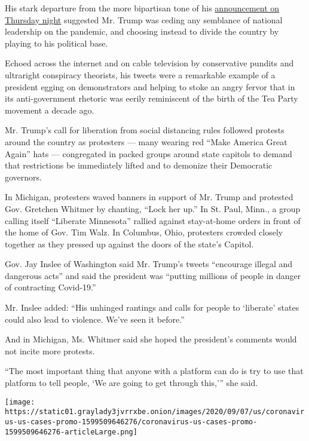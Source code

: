 His stark departure from the more bipartisan tone of his
\href{https://www.nytimes3xbfgragh.onion/2020/04/16/us/politics/coronavirus-trump-guidelines.html}{announcement
on Thursday night} suggested Mr. Trump was ceding any semblance of
national leadership on the pandemic, and choosing instead to divide the
country by playing to his political base.

Echoed across the internet and on cable television by conservative
pundits and ultraright conspiracy theorists, his tweets were a
remarkable example of a president egging on demonstrators and helping to
stoke an angry fervor that in its anti-government rhetoric was eerily
reminiscent of the birth of the Tea Party movement a decade ago.

Mr. Trump's call for liberation from social distancing rules followed
protests around the country as protesters --- many wearing red ``Make
America Great Again'' hats --- congregated in packed groups around state
capitols to demand that restrictions be immediately lifted and to
demonize their Democratic governors.

In Michigan, protesters waved banners in support of Mr. Trump and
protested Gov. Gretchen Whitmer by chanting, ``Lock her up.'' In St.
Paul, Minn., a group calling itself ``Liberate Minnesota'' rallied
against stay-at-home orders in front of the home of Gov. Tim Walz. In
Columbus, Ohio, protesters crowded closely together as they pressed up
against the doors of the state's Capitol.

Gov. Jay Inslee of Washington said Mr. Trump's tweets ``encourage
illegal and dangerous acts'' and said the president was ``putting
millions of people in danger of contracting Covid-19.''

Mr. Inslee added: ``His unhinged rantings and calls for people to
`liberate' states could also lead to violence. We've seen it before.''

And in Michigan, Ms. Whitmer said she hoped the president's comments
would not incite more protests.

``The most important thing that anyone with a platform can do is try to
use that platform to tell people, `We are going to get through this,'''
she said.

\href{https://www.nytimes3xbfgragh.onion/interactive/2020/us/coronavirus-us-cases.html}{}

\texttt{[image: https://static01.graylady3jvrrxbe.onion/images/2020/09/07/us/coronavirus-us-cases-promo-1599509646276/coronavirus-us-cases-promo-1599509646276-articleLarge.png]}

